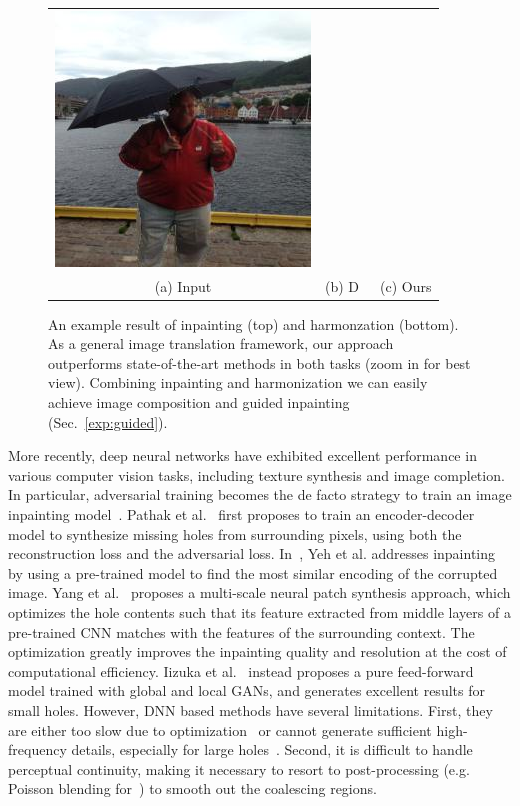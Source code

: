 \begin{figure}[t]
\begin{tabular}{ccc}
  \includegraphics[width=.34\textwidth]{figures/teaser/ours.jpg} \\
  (a) Input  & (b) D~\cite{tsai2017deep} & (c) Ours  \\
\end{tabular}
\caption{An example result of inpainting (top) and harmonzation (bottom). As a general image translation framework, our approach outperforms state-of-the-art methods in both tasks (zoom in for best view). Combining inpainting and harmonization we can easily achieve image composition and guided inpainting (Sec.~\ref{exp:guided}).}
\label{fig:teaser}
\vspace{-10pt}
\end{figure}

More recently, deep neural networks have exhibited excellent performance in various computer vision tasks, including texture synthesis and image completion. In particular, adversarial training becomes the de facto strategy to train an image inpainting model~\cite{pathak2016context,yeh2016semantic,li2017generative,yang2017high,iizuka2017globally}. Pathak et al.~\cite{pathak2016context} first proposes to train an encoder-decoder model to synthesize missing holes from surrounding pixels, using both the reconstruction loss and the adversarial loss. In~\cite{yeh2016semantic}, Yeh et al. addresses inpainting by using a pre-trained model to find the most similar encoding of the corrupted image. Yang et al.~\cite{yang2017high} proposes a multi-scale neural patch synthesis approach, which optimizes the hole contents such that its feature extracted from middle layers of a pre-trained CNN matches with the features of the surrounding context. The optimization greatly improves the inpainting quality and resolution at the cost of computational efficiency. Iizuka et al.~\cite{iizuka2017globally} instead proposes a pure feed-forward model trained with global and local GANs, and generates excellent results for small holes. However, DNN based methods have several limitations. First, they are either too slow due to optimization~\cite{yang2017high} or cannot generate sufficient high-frequency details, especially for large holes~\cite{iizuka2017globally}. Second, it is difficult to handle perceptual continuity, making it necessary to resort to post-processing (e.g. Poisson blending for~\cite{iizuka2017globally}) to smooth out the coalescing regions.

